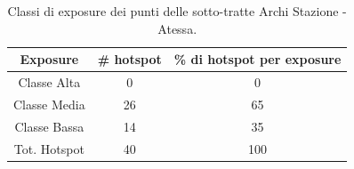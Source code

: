 \begin{table}[H]
	\centering
	\begin{tabular}{|c|c|c|}
		\hline
		\rowcolor[HTML]{C0C0C0} 
		\textbf{Exposure} & \textbf{\# hotspot} & \textbf{\% di hotspot per exposure} \\ \hline
		Classe Alta       & 0                  & 0                                  \\ \hline
		Classe Media      & 26                 & 65                        \\ \hline
		Classe Bassa      & 14              & 35                            \\ \hline
		Tot. Hotspot      & 40               & 100                                 \\ \hline
	\end{tabular}
	\caption{Classi di exposure dei punti delle sotto-tratte Archi Stazione - Atessa.}
	\label{risultati_archi_atessa}
\end{table}
